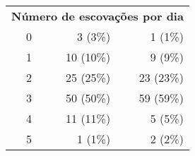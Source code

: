 \begin{table}[h!]
\begin{tabular}{llrr}
\multicolumn{4}{l}{\textbf{Número de escovações por dia}}                                                                                                                                                              \\
 & 0                                      & 3 (3\%)                                                                                & 1 (1\%)                                                                           \\
 & 1                                      & 10 (10\%)                                                                              & 9 (9\%)                                                                           \\
 & 2                                      & 25 (25\%)                                                                              & 23 (23\%)                                                                         \\
 & 3                                      & 50 (50\%)                                                                              & 59 (59\%)                                                                         \\
 & 4                                      & 11 (11\%)                                                                              & 5 (5\%)                                                                           \\
 & 5                                      & 1 (1\%)                                                                                & 2 (2\%)                                                                           \\ \hline
\end{tabular}

\end{table}